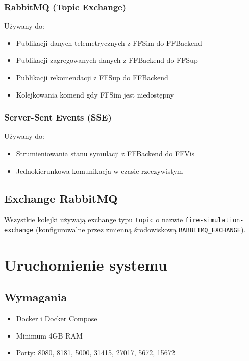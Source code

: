 \documentclass[11pt,a4paper]{article}
\begin{document}
\subsubsection{RabbitMQ (Topic Exchange)}

Używany do:
\begin{itemize}
    \item Publikacji danych telemetrycznych z FFSim do FFBackend
    \item Publikacji zagregowanych danych z FFBackend do FFSup
    \item Publikacji rekomendacji z FFSup do FFBackend
    \item Kolejkowania komend gdy FFSim jest niedostępny
\end{itemize}

\subsubsection{Server-Sent Events (SSE)}

Używany do:
\begin{itemize}
    \item Strumieniowania stanu symulacji z FFBackend do FFVis
    \item Jednokierunkowa komunikacja w czasie rzeczywistym
\end{itemize}

\subsection{Exchange RabbitMQ}

Wszystkie kolejki używają exchange typu \texttt{topic} o nazwie \texttt{fire-simulation-exchange} (konfigurowalne przez zmienną środowiskową \texttt{RABBITMQ\_EXCHANGE}).

\section{Uruchomienie systemu}

\subsection{Wymagania}

\begin{itemize}
    \item Docker i Docker Compose
    \item Minimum 4GB RAM
    \item Porty: 8080, 8181, 5000, 31415, 27017, 5672, 15672
\end{itemize}
\end{document}
